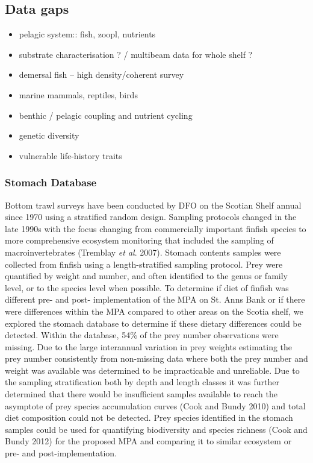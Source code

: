 \documentclass[letterpaper,portrait,11pt]{scrartcl}
\numberwithin{equation}{section}		%
\numberwithin{figure}{section}		%
\numberwithin{table}{section}				%
\begin{document}
\subsection{Data gaps}
\begin{itemize}
  \item pelagic system:: fish, zoopl, nutrients 
  \item substrate characterisation ?  / multibeam data for whole shelf ?
  \item demersal fish -- high density/coherent survey
  \item marine mammals, reptiles, birds
  \item benthic / pelagic coupling and nutrient cycling
  \item genetic diversity 
  \item vulnerable life-history traits
  
\end{itemize}	

\subsubsection{Stomach Database}
Bottom trawl surveys have been conducted by DFO on the Scotian Shelf annual since 1970 using a stratified random design.  Sampling protocols changed in the late 1990s with the focus changing from commercially important finfish species to more comprehensive ecosystem monitoring that included the sampling of macroinvertebrates (Tremblay \textit{et al}. 2007).  Stomach contents samples were collected from finfish using a length-stratified sampling protocol.  Prey were quantified by weight and number, and often identified to the genus or family level, or to the species level when possible.  To determine if diet of finfish was different pre- and post- implementation of the MPA on St. Anns Bank or if there were differences within the MPA compared to other areas on the Scotia shelf, we explored the stomach database to determine if these dietary differences could be detected. Within the database, 54\% of the prey number observations were missing.  Due to the large interannual variation in prey weights estimating the prey number consistently from non-missing data where both the prey number and weight was available was determined to be impracticable and unreliable.  Due to the sampling stratification both by depth and length classes it was further determined that there would be insufficient samples available to reach the asymptote of prey species accumulation curves (Cook and Bundy 2010) and total diet composition could not be detected.  Prey species identified in the stomach samples could be used for quantifying biodiversity and species richness (Cook and Bundy 2012) for the proposed MPA and comparing it to similar ecosystem or pre- and post-implementation.
\end{document}
